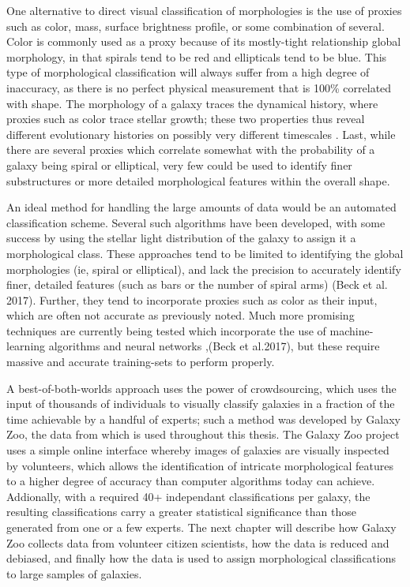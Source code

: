 One alternative to direct visual classification of morphologies is the use of proxies such as color, mass, surface brightness profile, or some combination of several. Color is commonly used as a proxy because of its mostly-tight relationship global morphology, in that spirals tend to be red and ellipticals tend to be blue. This type of morphological classification will always suffer from a high degree of inaccuracy, as there is no perfect physical measurement that is 100\% correlated with shape. The morphology of a galaxy traces the dynamical history, where proxies such as color trace stellar growth; these two properties thus reveal different evolutionary histories on possibly very different timescales \citet{Fortson2011}. Last, while there are several proxies which correlate somewhat with the probability of a galaxy being spiral or elliptical, very few could be used to identify finer substructures or more detailed morphological features within the overall shape. 

An ideal method for handling the large amounts of data would be an automated classification scheme. Several such algorithms have been developed, with some success \citep{Odewahn2002,Peng2002,Conselice2003} by using the stellar light distribution of the galaxy to assign it a morphological class. These approaches tend to be limited to identifying the global morphologies (ie, spiral or elliptical), and lack the precision to accurately identify finer, detailed features (such as bars or the number of spiral arms) (Beck et al. 2017). Further, they tend to incorporate proxies such as color as their input, which are often not accurate as previously noted. Much more promising techniques are currently being tested which incorporate the use of machine-learning algorithms and neural networks \citep{Dieleman2015, Huertas-Company2015},(Beck et al.2017), but these require massive and accurate training-sets to perform properly. 

A best-of-both-worlds approach uses the power of crowdsourcing, which uses the input of thousands of individuals to visually classify galaxies in a fraction of the time achievable by a handful of experts; such a method was developed by Galaxy Zoo, the data from which is used throughout this thesis. The Galaxy Zoo project uses a simple online interface whereby images of galaxies are visually inspected by volunteers, which allows the identification of intricate morphological features to a higher degree of accuracy than computer algorithms today can achieve. Addionally, with a required 40+ independant classifications per galaxy, the resulting classifications carry a greater statistical significance than those generated from one or a few experts. The next chapter will describe how Galaxy Zoo collects data from volunteer citizen scientists, how the data is reduced and debiased, and finally how the data is used to assign morphological classifications to large samples of galaxies.  








